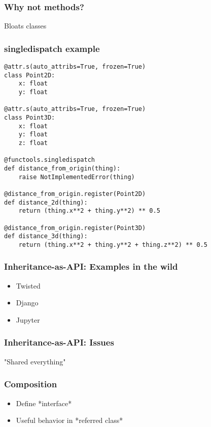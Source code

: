 \begin{frame}[fragile]
\frametitle{Why not methods?}

Bloats classes

\end{frame}

\begin{frame}[fragile]
\frametitle{singledispatch example}

\begin{lstlisting}
@attr.s(auto_attribs=True, frozen=True)
class Point2D:
    x: float
    y: float

@attr.s(auto_attribs=True, frozen=True)
class Point3D:
    x: float
    y: float
    z: float

@functools.singledispatch
def distance_from_origin(thing):
    raise NotImplementedError(thing)

@distance_from_origin.register(Point2D)
def distance_2d(thing):
    return (thing.x**2 + thing.y**2) ** 0.5

@distance_from_origin.register(Point3D)
def distance_3d(thing):
    return (thing.x**2 + thing.y**2 + thing.z**2) ** 0.5
\end{lstlisting}

\end{frame}


\begin{frame}[fragile]
\frametitle{Inheritance-as-API: Examples in the wild}

\begin{itemize}
\item Twisted \pause
\item Django \pause
\item Jupyter
\end{itemize}

\end{frame}

\begin{frame}[fragile]
\frametitle{Inheritance-as-API: Issues}

"Shared everything"
\end{frame}

\begin{frame}[fragile]
\frametitle{Composition}

\begin{itemize}
\item Define *interface*
\item Useful behavior in *referred class*
\end{itemize}

\end{frame}

